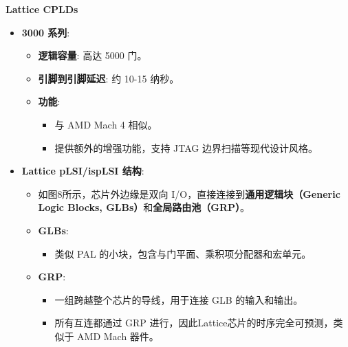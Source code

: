 \documentclass[
  ignorenonframetext,
  chinese,
]{beamer}
\providecommand{\tightlist}{%
  \setlength{\itemsep}{0pt}\setlength{\parskip}{0pt}}
\begin{document}
\begin{frame}
\begin{block}{\textbf{Lattice CPLDs}}
\begin{itemize}
  \begin{itemize}
  \tightlist
  \item
    \textbf{逻辑容量}: 600 到 2000 门。
  \item
    \textbf{特点}:

    \begin{itemize}
    \tightlist
    \item
      宏单元与 I/O 引脚的比率更高。
    \item
      速度性能优于 1000 系列。
    \end{itemize}
  \item
    \textbf{引脚到引脚延迟}: 5.5 纳秒，提供业界领先的速度。
  \end{itemize}
\item
  \textbf{3000 系列}:

  \begin{itemize}
  \tightlist
  \item
    \textbf{逻辑容量}: 高达 5000 门。
  \item
    \textbf{引脚到引脚延迟}: 约 10-15 纳秒。
  \item
    \textbf{功能}:

    \begin{itemize}
    \tightlist
    \item
      与 AMD Mach 4 相似。
    \item
      提供额外的增强功能，支持 JTAG 边界扫描等现代设计风格。
    \end{itemize}
  \end{itemize}
\item
  \textbf{Lattice pLSI/ispLSI 结构}:

  \begin{itemize}
  \tightlist
  \item
    如图8所示，芯片外边缘是双向
    I/O，直接连接到\textbf{通用逻辑块（Generic Logic Blocks,
    GLBs）}和\textbf{全局路由池（GRP）}。
  \item
    \textbf{GLBs}:

    \begin{itemize}
    \tightlist
    \item
      类似 PAL 的小块，包含与门平面、乘积项分配器和宏单元。
    \end{itemize}
  \item
    \textbf{GRP}:

    \begin{itemize}
    \tightlist
    \item
      一组跨越整个芯片的导线，用于连接 GLB 的输入和输出。
    \item
      所有互连都通过 GRP 进行，因此Lattice芯片的时序完全可预测，类似于
      AMD Mach 器件。
    \end{itemize}
  \end{itemize}
\end{itemize}


\end{block}
\end{frame}
\end{document}
